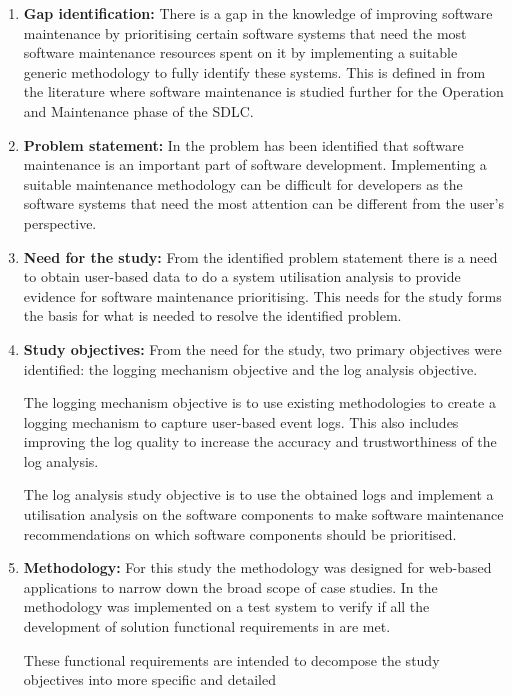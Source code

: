 \begin{enumerate}[label=\textbf{\Roman*.}]	
	\item \textbf{Gap identification:} There is a gap in the knowledge of improving software
	maintenance by prioritising certain software systems that need the most software maintenance
	resources spent on it by implementing a suitable generic methodology to fully identify these
	systems. This is defined in  from the literature where software maintenance is
	studied further for the Operation and Maintenance phase of the SDLC.
	\item \textbf{Problem statement:} In  the problem has been
	identified that software maintenance is an important part of software development. Implementing
	a suitable maintenance methodology can be difficult for developers as the software systems that
	need the most attention can be different from the user's perspective.  
	\item \textbf{Need for the study:} From the identified problem statement there is a need to
	obtain user-based data to do a system utilisation analysis to provide evidence for software
	maintenance prioritising. This needs for the study forms the basis for what is needed to resolve
	the identified problem.
	\item \textbf{Study objectives:} From the need for the study, two primary objectives were
	identified: the logging mechanism objective and the log analysis objective.\par The
	logging mechanism objective is to use existing methodologies to create a logging mechanism to
	capture user-based event logs. This also includes improving the log quality to increase the
	accuracy and trustworthiness of the log analysis.\par The log analysis study objective is to use
	the obtained logs and implement a utilisation analysis on the software components to make
	software maintenance recommendations on which software components should be prioritised.
	\item \textbf{Methodology:} For this study the methodology was designed for web-based
	applications to narrow down the broad scope of case studies. In  the methodology
	was implemented on a test system to verify if all the development of solution functional
	requirements in  are met.\par These functional
	requirements are intended to decompose the study objectives into more specific and detailed

\end{enumerate}
